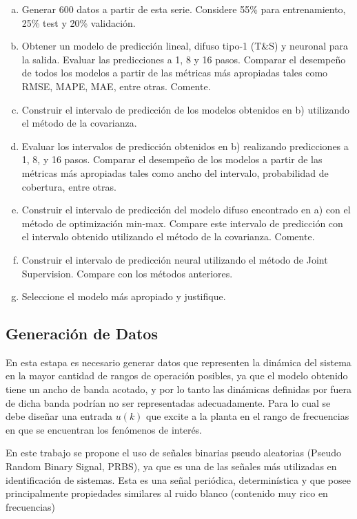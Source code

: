 \documentclass[12pt]{article}
\begin{document}
\begin{enumerate}[a)]
\item Generar 600 datos a partir de esta serie. Considere 55\% para entrenamiento, 25\% test y 20\% validación.
\item Obtener un modelo de predicción lineal, difuso tipo-1 (T\&S) y neuronal para la salida. Evaluar las predicciones a 1, 8 y 16 pasos. Comparar el desempeño de todos los modelos a partir de las métricas más apropiadas tales como RMSE, MAPE, MAE, entre otras. Comente.
\item Construir el intervalo de predicción de los modelos obtenidos en b) utilizando el método de la covarianza.
\item Evaluar los intervalos de predicción obtenidos en b) realizando predicciones a 1, 8, y 16 pasos. Comparar el desempeño de los modelos a partir de las métricas más apropiadas tales como ancho del intervalo, probabilidad de cobertura, entre otras.
\item Construir el intervalo de predicción del modelo difuso encontrado en a) con el método de optimización min-max. Compare este intervalo de predicción con el intervalo obtenido utilizando el método de la covarianza. Comente.
\item Construir el intervalo de predicción neural utilizando el método de Joint Supervision. Compare con los métodos anteriores.
\item Seleccione el modelo más apropiado y justifique.
\end{enumerate}

\subsection{Generación de Datos}

En esta estapa es necesario generar datos que representen la dinámica del sistema en la mayor cantidad de rangos de operación posibles, ya que el modelo obtenido tiene un ancho de banda acotado, y por lo tanto las dinámicas definidas por fuera de dicha banda podrían no ser representadas adecuadamente. Para lo cual se debe diseñar una entrada $u(k)$ que excite a la planta en el rango de frecuencias en que se encuentran los fenómenos de interés.

En este trabajo se propone el uso de señales binarias pseudo aleatorias (Pseudo Random Binary Signal, PRBS),  ya  que  es  una  de  las  señales  más  utilizadas  en  identificación  de sistemas. Esta es una señal periódica, determinística y que  posee  principalmente  propiedades  similares  al  ruido  blanco  (contenido  muy  rico  en frecuencias)
\end{document}
